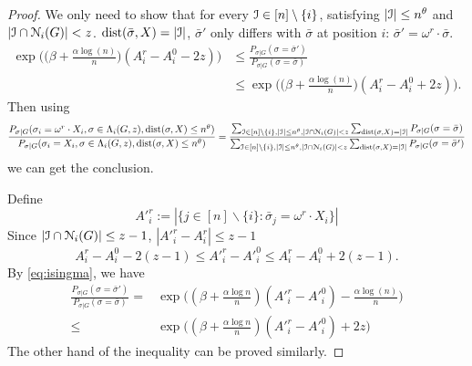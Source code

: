 \documentclass{article}
\begin{document}
\begin{proof}
	We only need to show that for every $\mathcal{I}\in [n]\setminus\{i\}$, satisfying $|\mathcal{I}|\le n^\theta$ and
	$|\mathcal{I} \cap \mathcal{N}_i(G)| < z$. $\operatorname{dist}(\bar{\sigma}, X) = |\mathcal{I}|$, $\bar{\sigma}'$ only differs with $\bar{\sigma}$ at
	position $i$: $\bar{\sigma}' = \omega^r \cdot \bar{\sigma}$.
	\begin{equation} \label{eq:qk}
	\begin{aligned}
	\exp\Big(\big(\beta+\frac{\alpha\log(n)}{n} \big) (A^r_i-A^0_i - 2z) \Big) & \le 
	\frac{P_{\sigma|G}(\sigma= \bar{\sigma}') } { P_{\sigma|G}(\sigma= \bar{\sigma} ) } \\
	& \le \exp\Big(\big(\beta+\frac{\alpha\log(n)}{n} \big) (A^r_i-A^0_i + 2z) \Big) .
	\end{aligned}
	\end{equation}
	Then using 
	$$
	\frac{P_{\sigma|G}(\sigma_i= \omega^r \cdot X_i, \sigma\in \Lambda_i(G,z) ,\operatorname{dist}(\sigma, X) \le n^{\theta} ) } 
	{ P_{\sigma|G}(\sigma_i=X_i, \sigma\in \Lambda_i(G,z) ,\operatorname{dist}(\sigma, X) \le n^{\theta} ) } 
	= \frac{\sum_{\mathcal{I}\in [n]\setminus\{i\},|\mathcal{I}|\le n^\theta,|\mathcal{I} \cap \mathcal{N}_i(G)| < z}\sum_{\operatorname{dist}(\sigma, X)=|\mathcal{I}|} P_{\sigma|G}(\sigma= \bar{\sigma} ) }
	{\sum_{\mathcal{I}\in [n]\setminus\{i\},|\mathcal{I}|\le n^\theta,|\mathcal{I} \cap \mathcal{N}_i(G)| < z}\sum_{\operatorname{dist}(\sigma, X)=|\mathcal{I}|} P_{\sigma|G}(\sigma = \bar{\sigma}' ) } 
	$$
	we can get the conclusion.
	
	Define
	$$
	A'^r_i := |\{ j \in [n]\backslash \{i\}:  \bar{\sigma}_j = \omega^r \cdot X_i \}|
	$$
	Since $|\mathcal{I}\cap \mathcal{N}_{i}(G)| \le z-1$, $|A'^r_i - A^r_i| \leq z-1$
	\begin{equation} \label{eq:oo}
	A^r_i-A^0_i-2(z-1) \le A'^r_i-A'^0_i\le A^r_i-A^0_i+2(z-1) .
	\end{equation}
	By \eqref{eq:isingma}, we have
	\begin{align*}
	 \frac{P_{\sigma|G}(\sigma=  \bar{\sigma}' ) } { P_{\sigma|G}(\sigma= \bar{\sigma}) }
	= & \exp\Big((\beta+\frac{\alpha\log n }{n})(A'^r_i-A'^0_i)
	-\frac{\alpha\log(n)}{n}
	\Big)
	\\
	\leq & \exp\Big((\beta+\frac{\alpha\log n }{n})(A'^r_i-A'^0_i)+2z \Big)
	\end{align*}
	The other hand of the inequality can be proved similarly.
\end{proof}
\end{document}
